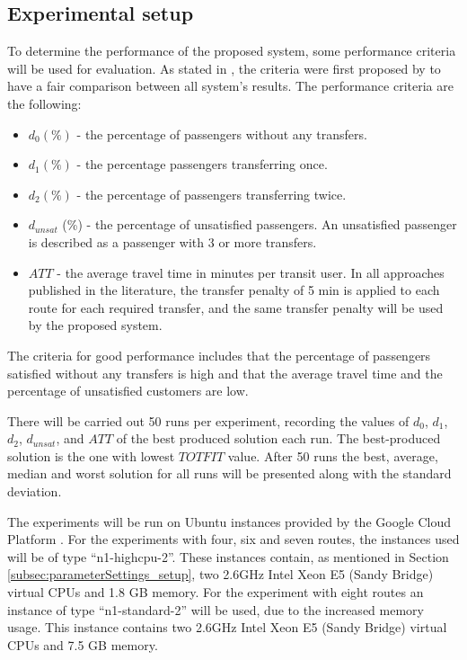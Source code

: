 \subsection{Experimental setup}
\label{subsec:performanceComparison_setup}
To determine the performance of the proposed system, some performance criteria will be used for evaluation. As stated in \citet{kechagiopoulos14}, the criteria were first proposed by \citet{chakroborty02} to have a fair comparison between all system's results. The performance criteria are the following:
\begin{itemize}
\item $d_0 (\%)$ - the percentage of passengers without any transfers. 
\item $d_1 (\%)$ - the percentage passengers transferring once. 
\item $d_2 (\%)$ - the percentage of passengers transferring twice. 
\item $d_{unsat}$ (\%) - the percentage of unsatisfied passengers. An unsatisfied passenger is described as a passenger with 3 or more transfers. 
\item $ATT$  - the average travel time in minutes per transit user. In all approaches published in the literature, the transfer penalty of 5 min is applied to each route for each required transfer, and the same transfer penalty will be used by the proposed system.
\end{itemize}
The criteria for good performance includes that the percentage of passengers satisfied without any transfers is high and that the average travel time and the percentage of unsatisfied customers are low. 

There will be carried out 50 runs per experiment, recording the values of $d_0$, $d_1$, $d_2$, $d_{unsat}$, and $ATT$ of the best produced solution each run. The best-produced solution is the one with lowest $TOTFIT$ value. After 50 runs the best, average, median and worst solution for all runs will be presented along with the standard deviation. %

The experiments will be run on Ubuntu instances provided by the Google Cloud Platform \citep{website:google}. For the experiments with four, six and seven routes, the instances used will be of type ``n1-highcpu-2''. These instances contain, as mentioned in Section \vref{subsec:parameterSettings_setup}, two 2.6GHz Intel Xeon E5 (Sandy Bridge) virtual CPUs and 1.8 GB memory. For the experiment with eight routes an instance of type ``n1-standard-2'' will be used, due to the increased memory usage. This instance contains two 2.6GHz Intel Xeon E5 (Sandy Bridge) virtual CPUs and 7.5 GB memory.

